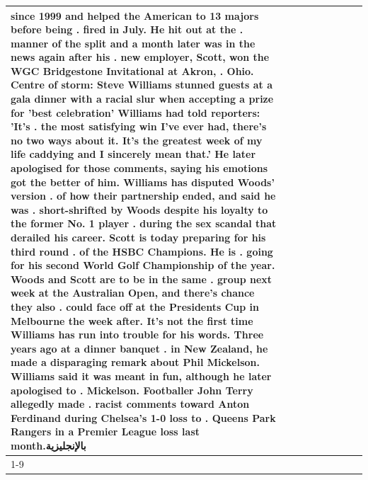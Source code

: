 \begin{table}[H]
\begin{tabular}{lllrlllll}
since 1999 and helped the American to 13 majors before being . fired in July. He hit out at the . manner of the split and a month later was in the news again after his . new employer, Scott, won the WGC Bridgestone Invitational at Akron, . Ohio. Centre of storm: Steve Williams stunned guests at a gala dinner with a racial slur when accepting a prize for 'best celebration' Williams had told reporters: 'It's . the most satisfying win I've ever had, there's no two ways about it. It's the greatest week of my life caddying and I sincerely mean that.' He later apologised for those comments, saying his emotions got the better of him. Williams has disputed Woods' version . of how their partnership ended, and said he was . short-shrifted by Woods despite his loyalty to the former No. 1 player . during the sex scandal that derailed his career. Scott is today preparing for his third round . of the HSBC Champions. He is . going for his second World Golf Championship of the year. Woods and Scott are to be in the same . group next week at the Australian Open, and there's chance they also . could face off at the Presidents Cup in Melbourne the week after. It's not the first time Williams has run into trouble for his words. Three years ago at a dinner banquet . in New Zealand, he made a disparaging remark about Phil Mickelson. Williams said it was meant in fun, although he later apologised to . Mickelson. Footballer John Terry allegedly made . racist comments toward Anton Ferdinand during Chelsea's 1-0 loss to . Queens Park Rangers in a Premier League loss last month.بالإنجليزية \\
\cline{1-9}

\end{tabular}
\end{table}
